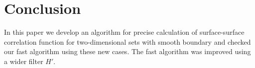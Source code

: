 \documentclass[reprint,amsmath,amssymb,aps,pre,showkeys,showpacs]{revtex4-1}
\begin{document}
\section{Conclusion}
\label{sec:summary}
In this paper we develop an algorithm for precise calculation of surface-surface
correlation function for two-dimensional sets with smooth boundary and checked
our fast algorithm using these new cases. The fast algorithm was improved using
a wider filter $H'$.


\end{document}

